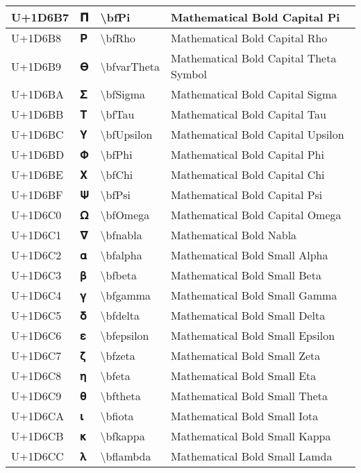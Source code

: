 \begin{table}[h]
\begin{tabulary}{\linewidth}{|L|L|L|L|}
\hline
U+1D6B7 & 𝚷 & {\textbackslash}bfPi & Mathematical Bold Capital Pi \\
\hline
U+1D6B8 & 𝚸 & {\textbackslash}bfRho & Mathematical Bold Capital Rho \\
\hline
U+1D6B9 & 𝚹 & {\textbackslash}bfvarTheta & Mathematical Bold Capital Theta Symbol \\
\hline
U+1D6BA & 𝚺 & {\textbackslash}bfSigma & Mathematical Bold Capital Sigma \\
\hline
U+1D6BB & 𝚻 & {\textbackslash}bfTau & Mathematical Bold Capital Tau \\
\hline
U+1D6BC & 𝚼 & {\textbackslash}bfUpsilon & Mathematical Bold Capital Upsilon \\
\hline
U+1D6BD & 𝚽 & {\textbackslash}bfPhi & Mathematical Bold Capital Phi \\
\hline
U+1D6BE & 𝚾 & {\textbackslash}bfChi & Mathematical Bold Capital Chi \\
\hline
U+1D6BF & 𝚿 & {\textbackslash}bfPsi & Mathematical Bold Capital Psi \\
\hline
U+1D6C0 & 𝛀 & {\textbackslash}bfOmega & Mathematical Bold Capital Omega \\
\hline
U+1D6C1 & 𝛁 & {\textbackslash}bfnabla & Mathematical Bold Nabla \\
\hline
U+1D6C2 & 𝛂 & {\textbackslash}bfalpha & Mathematical Bold Small Alpha \\
\hline
U+1D6C3 & 𝛃 & {\textbackslash}bfbeta & Mathematical Bold Small Beta \\
\hline
U+1D6C4 & 𝛄 & {\textbackslash}bfgamma & Mathematical Bold Small Gamma \\
\hline
U+1D6C5 & 𝛅 & {\textbackslash}bfdelta & Mathematical Bold Small Delta \\
\hline
U+1D6C6 & 𝛆 & {\textbackslash}bfepsilon & Mathematical Bold Small Epsilon \\
\hline
U+1D6C7 & 𝛇 & {\textbackslash}bfzeta & Mathematical Bold Small Zeta \\
\hline
U+1D6C8 & 𝛈 & {\textbackslash}bfeta & Mathematical Bold Small Eta \\
\hline
U+1D6C9 & 𝛉 & {\textbackslash}bftheta & Mathematical Bold Small Theta \\
\hline
U+1D6CA & 𝛊 & {\textbackslash}bfiota & Mathematical Bold Small Iota \\
\hline
U+1D6CB & 𝛋 & {\textbackslash}bfkappa & Mathematical Bold Small Kappa \\
\hline
U+1D6CC & 𝛌 & {\textbackslash}bflambda & Mathematical Bold Small Lamda \\

\end{tabulary}
\end{table}
